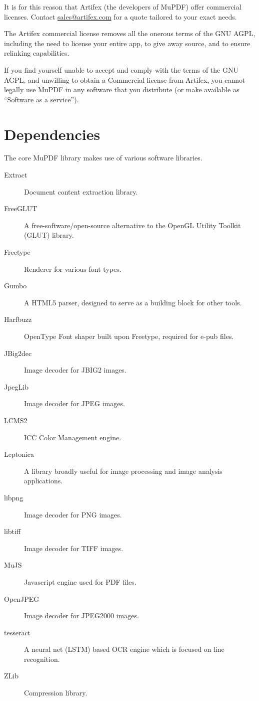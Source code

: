 \documentclass[oneside]{book}
\begin{document}
It is for this reason that Artifex (the developers of MuPDF) offer commercial licenses. Contact \href{mailto:sales@artifex.com}{sales@artifex.com} for a quote tailored to your exact needs.

The Artifex commercial license removes all the onerous terms of the GNU AGPL, including the need to license your entire app, to give away source, and to ensure relinking capabilities.

If you find yourself unable to accept and comply with the terms of the GNU AGPL, and unwilling to obtain a Commercial license from Artifex, you cannot legally use MuPDF in any software that you distribute (or make available as ``Software as a service'').


\section{Dependencies}

The core MuPDF library makes use of various software libraries.

\begin{description}
\item[Extract] Document content extraction library.
\item[FreeGLUT] A free-software/open-source alternative to the OpenGL Utility Toolkit (GLUT) library.
\item[Freetype] Renderer for various font types.
\item[Gumbo] A HTML5 parser, designed to serve as a building block for other tools.
\item[Harfbuzz] OpenType Font shaper built upon Freetype, required for e-pub files.
\item[JBig2dec] Image decoder for JBIG2 images.
\item[JpegLib] Image decoder for JPEG images.
\item[LCMS2] ICC Color Management engine.
\item[Leptonica] A library broadly useful for image processing and image analysis applications.
\item[libpng] Image decoder for PNG images.
\item[libtiff] Image decoder for TIFF images.
\item[MuJS] Javascript engine used for PDF files.
\item[OpenJPEG] Image decoder for JPEG2000 images.
\item[tesseract] A neural net (LSTM) based OCR engine which is focused on line recognition.
\item[ZLib] Compression library.
\end{description}
\end{document}

